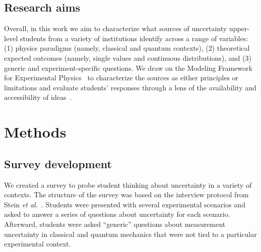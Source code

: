 \documentclass[english,aps,prstper,reprint,showpacs,longbibliography,superscriptaddress,nofootinbib]{revtex4-2}
\begin{document}
\subsection{Research aims}

Overall, in this work we aim to characterize what sources of uncertainty upper-level students from a variety of institutions identify across a range of variables: (1) physics paradigms (namely, classical and quantum contexts), (2) theoretical expected outcomes (namely, single values and continuous distributions), and (3) generic and experiment-specific questions. We draw on the Modeling Framework for Experimental Physics~\cite{DounasFrazer2018,Zwickl2015} to characterize the sources as either principles or limitations and evaluate students' responses through a lens of the availability and accessibility of ideas~\cite{Heckler2018}. 

\section{Methods}


\subsection{Survey development}
\label{sec:survey}

We created a survey to probe student thinking about uncertainty in a variety of contexts. The structure of the survey was based on the interview protocol from Stein \textit{et al.}~\cite{Stein2019}. Students were presented with several experimental scenarios and asked to answer a series of questions about uncertainty for each scenario. Afterward, students were asked ``generic'' questions about measurement uncertainty in classical and quantum mechanics that were not tied to a particular experimental context. 
\end{document}
